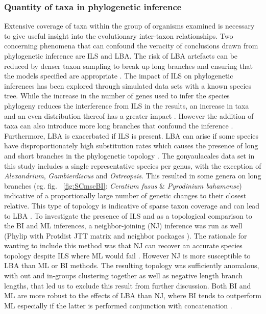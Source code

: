 \documentclass[fleqn,10pt,lineno]{wlpeerj} %
\begin{document}
\subsubsection*{Quantity of taxa in phylogenetic inference}
Extensive coverage of taxa within the group of organisms examined is necessary to give useful insight into the evolutionary inter-taxon relationships.
Two concerning phenomena that can confound the veracity of conclusions drawn from phylogenetic inference are ILS and LBA. 
The risk of LBA artefacts can be reduced by denser taxon sampling to break up long branches and ensuring that the models specified are appropriate \cite{heath2008taxon}. 
The impact of ILS on phylogenetic inferences has been explored through simulated data sets with a known species tree. 
While the increase in the number of genes used to infer the species phylogeny reduces the interference from ILS in the results, an increase in taxa and an even distribution thereof has a greater impact \cite{maddison2006inferring}.
However the addition of taxa can also introduce more long branches that confound the inference \cite{heath2008taxon}. 
Furthermore, LBA is exacerbated if ILS is present. 
LBA can arise if some species have disproportionately high substitution rates which causes the presence of long and short branches in the phylogenetic topology \cite{liu2014coalescent}. 
The gonyaulacales data set in this study includes a single representative species per genus, with the exception of \textit{Alexandrium}, \textit{Gambierdiscus} and \textit{Ostreopsis}. 
This resulted in some genera on long branches (eg. fig. ~\ref{fig:SCmscBI}: \textit{Ceratium fusus} \& \textit{Pyrodinium bahamense}) indicative of a proportionally large number of genetic changes to their closest relative.
This type of topology is indicative of sparse taxon coverage and can lead to LBA \cite{heath2008taxon}. 
To investigate the presence of ILS and as a topological comparison to the BI and ML inferences, a neighbor-joining (NJ) inference was run as well (Phylip with Protdist JTT matrix and neighbor packages \cite{felsenstein2005phylip}). 
The rationale for wanting to include this method was that NJ can recover an accurate species topology despite ILS where ML would fail  \cite{mendes2017concatenation}.
However NJ is more susceptible to LBA than ML or BI methods. 
The resulting topology was sufficiently anomalous, with out and in-groups clustering together as well as negative length branch lengths, that led us to exclude this result from further discussion. 
Both BI and ML are more robust to the effects of LBA than NJ, where BI tends to outperform ML especially if the latter is performed conjunction with concatenation \cite{kubatko2007inconsistency,roch2015likelihood}. 
\end{document}

